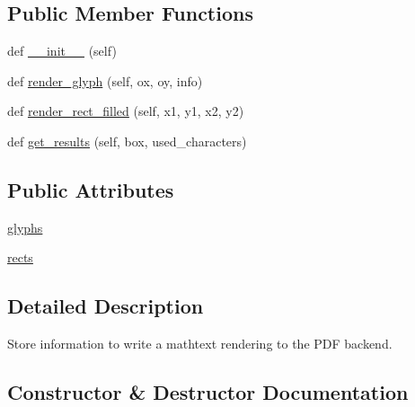 \subsection*{Public Member Functions}
\begin{DoxyCompactItemize}
\item 
def \hyperlink{classmatplotlib_1_1mathtext_1_1MathtextBackendPdf_a80f346cd27eb35fa84d4cb03c213a97c}{\+\_\+\+\_\+init\+\_\+\+\_\+} (self)
\item 
def \hyperlink{classmatplotlib_1_1mathtext_1_1MathtextBackendPdf_a29c98cb35c68114a004eabc5276876d0}{render\+\_\+glyph} (self, ox, oy, info)
\item 
def \hyperlink{classmatplotlib_1_1mathtext_1_1MathtextBackendPdf_aa669865d0fba57f75836f00bc06eebc3}{render\+\_\+rect\+\_\+filled} (self, x1, y1, x2, y2)
\item 
def \hyperlink{classmatplotlib_1_1mathtext_1_1MathtextBackendPdf_a62585266fd5eea9c1472f4c666006ec9}{get\+\_\+results} (self, box, used\+\_\+characters)
\end{DoxyCompactItemize}
\subsection*{Public Attributes}
\begin{DoxyCompactItemize}
\item 
\hyperlink{classmatplotlib_1_1mathtext_1_1MathtextBackendPdf_a686bd5847ac253e6eca13343d53bf689}{glyphs}
\item 
\hyperlink{classmatplotlib_1_1mathtext_1_1MathtextBackendPdf_ab96d69b04e33ed4ae0e7289e769da91e}{rects}
\end{DoxyCompactItemize}


\subsection{Detailed Description}
\begin{DoxyVerb}Store information to write a mathtext rendering to the PDF backend.\end{DoxyVerb}
 

\subsection{Constructor \& Destructor Documentation}
\mbox{\label{classmatplotlib_1_1mathtext_1_1MathtextBackendPdf_a80f346cd27eb35fa84d4cb03c213a97c}} 
